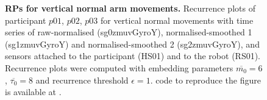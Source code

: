 \begin{figure}
	[RPs for vertical normal arm movements]{
	{\bf RPs for vertical normal arm movements.}	
	Recurrence plots %
	of participant $p01$, $p02$, $p03$ for vertical normal 
	movements with time series of raw-normalised (sg0zmuvGyroY), 
	normalised-smoothed 1 (sg1zmuvGyroY) and 
	normalised-smoothed 2 (sg2zmuvGyroY), and 
	sensors attached to the participant (HS01) and to the robot (RS01).
	Recurrence plots were computed with 
	embedding parameters $\overline{m_0}=6$, $\overline{\tau_0}=8$ and
	recurrence threshold $\epsilon=1$.
	\R code to reproduce the figure is available at 
	.
        }
    \label{fig:rp_VN}
\end{figure}



